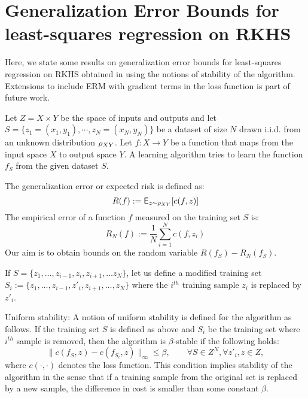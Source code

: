 \chapter{Generalization Error Bounds for least-squares regression on RKHS }%
\label{a:bousquet}
Here, we state some results on generalization error bounds for least-squares regression on RKHS obtained in \cite{boueli01} using the notions of stability of the algorithm.
Extensions to include ERM with gradient terms in the loss function is part of future work. 

Let $Z = X \times Y$ be the space of inputs and outputs and let $S = \{z_1 = (x_1, y_1), \cdots,z_N = (x_N,y_N)\}$ be a dataset of size $N$ drawn i.i.d. from an unknown distribution $\rho_{XY}$. Let $f:X \to Y$ be a function that maps from the input space $X$ to output space $Y$. A learning algorithm tries to learn the function $f_S$ from the given dataset $S$. 

The generalization error or expected risk is defined as:
\[
R(f) := {\sf E}_{z \sim \rho_{XY}} [c(f,z)]
\]
The empirical error of a function $f$ measured on the training set $S$ is:
\[
R_N(f) := \frac{1}{N}\sum_{i=1}^N c(f,z_i)
\]
Our aim is to obtain bounds on the random variable $R(f_S) - R_N(f_S)$. 

If $S = \{z_1,\dots, z_{i-1},z_i,z_{i+1},\dots z_N\}$, let us define a modified training set $S_i :=\{z_1,\dots, z_{i-1},z'_i,z_{i+1},\dots,z_N\}$ where the $i^{th}$ training sample $z_i$ is replaced by $z'_i$.

Uniform stability: A notion of uniform stability is defined for the algorithm as follows. If the training set $S$ is defined as above and $S_i$ be the training set where $i^{th}$ sample is removed, then the algorithm is $\beta$-stable if the following holds:
\[
\|c(f_S, z ) - c(f_{S_i},z)\|_{\infty} \leq \beta, \qquad \forall S \in Z^N, \forall z'_i, z \in Z,
\]
where $c(\cdot,\cdot)$ denotes the loss function. 
This condition implies stability of the algorithm in the sense that if a training sample from the original set is replaced by a new sample, the difference in cost is smaller than some constant $\beta$. 

